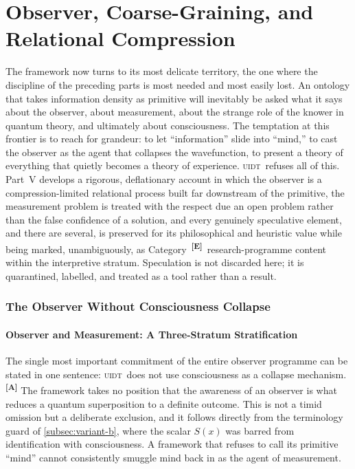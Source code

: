 \documentclass[12pt,a4paper,twoside]{article}
\theoremstyle{plain}
\theoremstyle{definition}
\theoremstyle{remark}
\newcommand{\UIDT}{\textsc{uidt}}
\newcommand{\catmark}[1]{\textsuperscript{\textsf{\textbf{[#1]}}}}
\begin{document}
\part{Observer, Coarse-Graining, and Relational Compression}
\label{part:observer}

\noindent The framework now turns to its most delicate territory, the one where the discipline of the preceding parts is most needed and most easily lost. An ontology that takes information density as primitive will inevitably be asked what it says about the observer, about measurement, about the strange role of the knower in quantum theory, and ultimately about consciousness. The temptation at this frontier is to reach for grandeur: to let ``information'' slide into ``mind,'' to cast the observer as the agent that collapses the wavefunction, to present a theory of everything that quietly becomes a theory of experience. \UIDT\ refuses all of this. Part~V develops a rigorous, deflationary account in which the observer is a compression-limited relational process built far downstream of the primitive, the measurement problem is treated with the respect due an open problem rather than the false confidence of a solution, and every genuinely speculative element, and there are several, is preserved for its philosophical and heuristic value while being marked, unambiguously, as Category~\catmark{E}\ research-programme content within the interpretive stratum. Speculation is not discarded here; it is quarantined, labelled, and treated as a tool rather than a result.

\section{The Observer Without Consciousness Collapse}
\label{sec:observer-no-collapse}

\subsection{Observer and Measurement: A Three-Stratum Stratification}
\label{subsec:observer-stratification}

The single most important commitment of the entire observer programme can be stated in one sentence: \UIDT\ does not use consciousness as a collapse mechanism.\catmark{A} The framework takes no position that the awareness of an observer is what reduces a quantum superposition to a definite outcome. This is not a timid omission but a deliberate exclusion, and it follows directly from the terminology guard of \cref{subsec:variant-b}, where the scalar $S(x)$ was barred from identification with consciousness. A framework that refuses to call its primitive ``mind'' cannot consistently smuggle mind back in as the agent of measurement.
\end{document}
